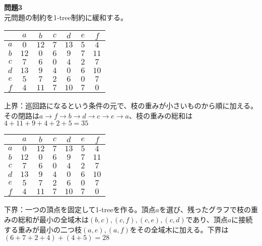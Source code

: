 \documentclass{jsarticle}
\begin{document}
{\bf 問題3}\\
元問題の制約を1-tree制約に緩和する。\\
\begin{center}
\begin{tabular}{c| c c c c c c}
& $a$ & $b$ & $c$ & $d$ & $e$ & $f$ \\
\hline
$a$ & $0$ & $12$ & $7$ & $13$ & $5$ & $4$ \\
$b$ & $12$ & $0$ & $6$ & $9$ & $7$ & $11$ \\
$c$ & $7$ & $6$ & $0$ & $4$ & $2$ & $7$ \\
$d$ & $13$ & \textcircled{$9$} & \textcircled{$4$} & $0$ & $6$ & $10$ \\
$e$ & \textcircled{$5$} & $7$ & \textcircled{$2$} & $6$ & $0$ & $7$ \\
$f$ & \textcircled{$4$} & \textcircled{$11$} & $7$ & $10$ & $7$ & $0$ \\
\end{tabular}
\end{center}
上界：巡回路になるという条件の元で、枝の重みが小さいものから順に加える。その閉路は$a \rightarrow f \rightarrow b \rightarrow d \rightarrow c \rightarrow e \rightarrow a$、枝の重みの総和は$4+11+9+4+2+5=35$\\
\begin{center}
\begin{tabular}{c| c c c c c c}
& $a$ & $b$ & $c$ & $d$ & $e$ & $f$ \\
\hline
$a$ & $0$ & $12$ & $7$ & $13$ & $5$ & $4$ \\
$b$ & $12$ & $0$ & \textcircled{$6$} & $9$ & $7$ & $11$ \\
$c$ & $7$ & $6$ & $0$ & $4$ & $2$ & $7$ \\
$d$ & $13$ & $9$ & \textcircled{$4$} & $0$ & $6$ & $10$ \\
$e$ & \textcircled{$5$} & $7$ & \textcircled{$2$} & $6$ & $0$ & $7$ \\
$f$ & \textcircled{$4$} & $11$ & \textcircled{$7$} & $10$ & $7$ & $0$ \\
\end{tabular}
\end{center}
下界：一つの頂点を固定して1-treeを作る。頂点$a$を選び、残ったグラフで枝の重みの総和が最小の全域木は$(b,c),(c,f),(c,e),(c,d)$であり、頂点$a$に接続する重みが最小の二つ枝$(a,e),(a,f)$をその全域木に加える。下界は$(6+7+2+4)+(4+5)=28$
\end{document}
